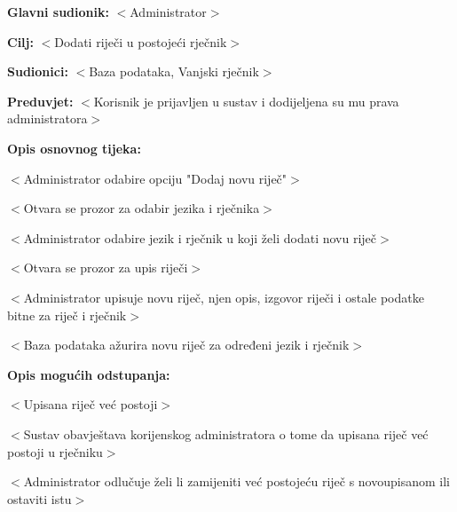 					\noindent {}
					\begin{packed_item}
	
						\item \textbf{Glavni sudionik: }$<$Administrator$>$
						\item  \textbf{Cilj:} $<$Dodati riječi u postojeći rječnik$>$
						\item  \textbf{Sudionici:} $<$Baza podataka, Vanjski rječnik$>$
						\item  \textbf{Preduvjet:} $<$Korisnik je prijavljen u sustav i dodijeljena su mu prava administratora$>$
						\item  \textbf{Opis osnovnog tijeka:}
						
						\item[] \begin{packed_enum}
	
							\item $<$Administrator odabire opciju "Dodaj novu riječ"$>$
							\item $<$Otvara se prozor za odabir jezika i rječnika$>$
							\item $<$Administrator odabire jezik i rječnik u koji želi dodati novu riječ$>$
							\item $<$Otvara se prozor za upis riječi$>$
							\item $<$Administrator upisuje novu riječ, njen opis, izgovor riječi i ostale podatke bitne za riječ i rječnik$>$
							\item $<$Baza podataka ažurira novu riječ za određeni jezik i rječnik$>$
						\end{packed_enum}

						\item  \textbf{Opis mogućih odstupanja:}
						
						\item[] \begin{packed_item}
	
							\item[5.a] $<$Upisana riječ već postoji$>$
							\item[] \begin{packed_enum}
								
								\item $<$Sustav obavještava korijenskog administratora o tome da upisana riječ već postoji u rječniku$>$
								\item $<$Administrator odlučuje želi li zamijeniti već postojeću riječ s novoupisanom ili ostaviti istu$>$
								
							\end{packed_enum}
						\end{packed_item}
						
					\end{packed_item}

